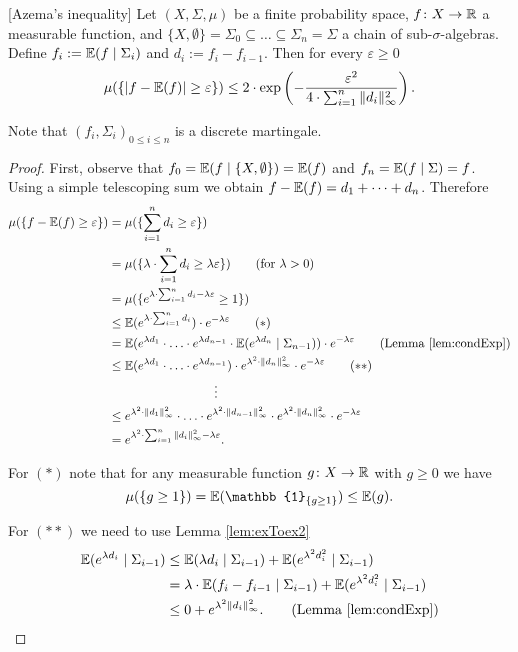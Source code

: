 \begin{lemma}\label{lem:azema}[Azema's inequality]
Let $(X,\Sigma,\mu)$ be a finite probability space, $f\colon X\to\mathbb{R}$ a measurable function, and $\{X,\emptyset\}=\Sigma_0\subseteq\dots\subseteq\Sigma_n=\Sigma$ a chain of sub-$\sigma$-algebras. Define $f_i:=\mathbb{E}(f\mid\Sigma_i)$ and $d_i:=f_i-f_{i-1}$. Then for every $\varepsilon\geq0$
\[\mu(\{|f-\mathbb{E}(f)|\geq \varepsilon\})\leq 2\cdot\exp\left(-\frac{\varepsilon^2}{4\cdot\sum_{i=1}^{n}\|d_i\|^2_\infty}\right).\]
\end{lemma}
Note that $(f_i,\Sigma_i)_{0\leq i\leq n}$ is a discrete martingale. 
\begin{proof} First, observe that $f_0=\mathbb{E}(f\mid \{X,\emptyset\})=\mathbb{E}(f)$ and $f_n=\mathbb{E}(f\mid\Sigma)=f$. Using a simple telescoping sum we obtain $f-\mathbb{E}(f)=d_1+\dots+d_n$. Therefore
\begin{align*}
\mu(\{f-\E(f)\geq \varepsilon\})&=\mu(\{\sum_{i=1}^{n}d_i\geq  \varepsilon\})\\
&=\mu(\{\lambda\cdot\sum_{i=1}^{n}d_i\geq \lambda \varepsilon\})\tag{for $\lambda>0$}\\
&=\mu(\{e^{\lambda\cdot\sum_{i=1}^{n}d_i-\lambda \varepsilon}\geq 1\})\\
&\leq\E(e^{\lambda\cdot\sum_{i=1}^{n}d_i})\cdot e^{-\lambda \varepsilon}\tag{$\ast$}\\
&=\E(e^{\lambda d_1}\cdot\ldots\cdot e^{\lambda d_{n-1}}\cdot\E(e^{\lambda d_n}\mid \Sigma_{n-1}))\cdot e^{-\lambda \varepsilon}\tag{Lemma \ref{lem:condExp}}\\
&\leq\E(e^{\lambda d_1}\cdot\ldots\cdot e^{\lambda d_{n-1}})\cdot e^{\lambda^2\cdot \|d_n\|^2_\infty}\cdot e^{-\lambda \varepsilon}\tag{$\ast\ast$}\\
&\hspace{3cm}\vdots\\
&\leq e^{\lambda^2\cdot \|d_1\|^2_\infty}\cdot\ldots\cdot e^{\lambda^2\cdot \|d_{n-1}\|^2_\infty}\cdot e^{\lambda^2\cdot \|d_n\|^2_\infty}\cdot e^{-\lambda \varepsilon}\\
&=e^{\lambda^2\cdot\sum_{i=1}^n\|d_i\|^2_\infty-\lambda \varepsilon}.
\end{align*}

For $(\ast)$ note that for any measurable function $g\colon X\to\mathbb{R}$ with $g\geq0$ we have %
\[\mu(\{g\geq1\})=\E(\mathbb{1}_{\{g\geq1\}})\leq\E(g).\]

For $(\ast\ast)$ we need to use Lemma \ref{lem:exToex2}
\begin{align*}
\E(e^{\lambda d_i}\mid \Sigma_{i-1})&\leq \E(\lambda d_i\mid\Sigma_{i-1})+\E(e^{\lambda^2 d^2_i}\mid\Sigma_{i-1})\\
&=\lambda\cdot\E( f_i-f_{i-1}\mid\Sigma_{i-1}) + \E(e^{\lambda^2 d^2_i}\mid\Sigma_{i-1})\\
&\leq 0 + e^{\lambda^2 \|d_i\|_\infty^2}.\tag{Lemma \ref{lem:condExp}}
\end{align*}


\end{proof}
